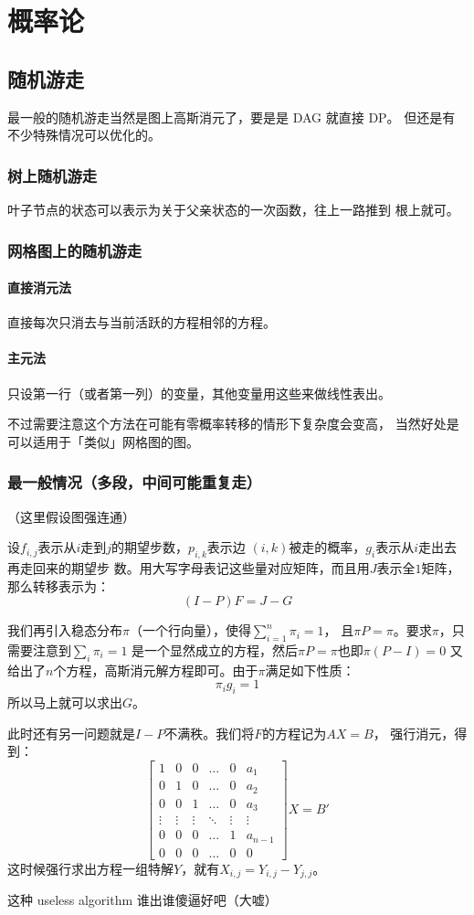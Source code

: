 \chapter{概率论}
\section{随机游走}
最一般的随机游走当然是图上高斯消元了，要是是 DAG 就直接 DP。
但还是有不少特殊情况可以优化的。

\subsection{树上随机游走}
叶子节点的状态可以表示为关于父亲状态的一次函数，往上一路推到
根上就可。
\subsection{网格图上的随机游走}
\subsubsection{直接消元法}
直接每次只消去与当前活跃的方程相邻的方程。

\subsubsection{主元法}
只设第一行（或者第一列）的变量，其他变量用这些来做线性表出。\par
不过需要注意这个方法在可能有零概率转移的情形下复杂度会变高，
当然好处是可以适用于「类似」网格图的图。
\subsection{最一般情况（多段，中间可能重复走）}
（这里假设图强连通）\par
设$f_{i, j}$表示从$i$走到$j$的期望步数，$p_{i, k}$表示边
$(i, k)$被走的概率，$g_i$表示从$i$走出去再走回来的期望步
数。用大写字母表记这些量对应矩阵，而且用$J$表示全$1$矩阵，
那么转移表示为：
\[(I - P)F = J - G\]\par
我们再引入稳态分布$\pi$（一个行向量），使得$\sum_{i=1}^n \pi_{i} = 1$，
且$\pi P = \pi$。要求$\pi$，只需要注意到$\sum_{i}\pi_i = 1$
是一个显然成立的方程，然后$\pi P = \pi$也即$\pi(P - I) = 0$
又给出了$n$个方程，高斯消元解方程即可。由于$\pi$满足如下性质：
\[\pi_i g_i = 1\]
所以马上就可以求出$G$。\par
此时还有另一问题就是$I-P$不满秩。我们将$F$的方程记为$AX=B$，
强行消元，得到：
\[
\begin{bmatrix}
  1 & 0 & 0 & \ldots & 0 & a_1\\
  0 & 1 & 0 & \ldots & 0 & a_2\\
  0 & 0 & 1 & \ldots & 0 & a_3\\
  \vdots & \vdots & \vdots & \ddots & \vdots & \vdots\\
  0 & 0 & 0 & \ldots & 1 & a_{n-1}\\
  0 & 0 & 0 & \ldots & 0 & 0
\end{bmatrix}X=B'
\]
这时候强行求出方程一组特解$Y$，就有$X_{i,j} = Y_{i,j} - Y_{j,j}$。\par
这种 useless algorithm 谁出谁傻逼好吧（大嘘）
